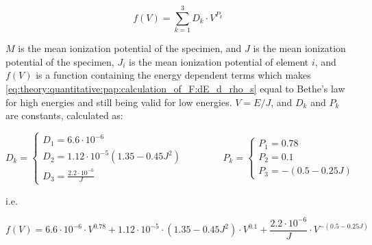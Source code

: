\begin{equation}
    \label{eq:theory:quantitative:pap:calculation_of_F:dE_d_rho_s:one_over_f}
    f(V) = \sum \limits_{k=1}^{3} D_k \cdot V^{P_k}
\end{equation}

$M$ is the mean ionization potential of the specimen, and $J$ is the mean ionization potential of the specimen, $J_i$ is the mean ionization potential of element $i$, and $f(V)$ is a function containing the energy dependent terms which makes \cref{eq:theory:quantitative:pap:calculation_of_F:dE_d_rho_s} equal to Bethe's law for high energies and still being valid for low energies. $V = E/J$, and $D_k$ and $P_k$ are constants, calculated as:


\begin{equation}
    \label{eq:theory:quantitative:pap:calculation_of_F:dE_d_rho_s:one_over_f:d_k}
    D_k = \begin{cases}
        D_1 = 6.6 \cdot 10^{-6}                                 \\
        D_2 = 1.12 \cdot 10^{-5}(1.35 - 0.45 J^2) \qquad \qquad \\
        D_3 = \frac{2.2 \cdot 10^{-6}}{J}
    \end{cases}
    P_k = \begin{cases}
        P_1 =  0.78 \\
        P_2 = 0.1   \\
        P_3 =  -(0.5-0.25J)
    \end{cases}
\end{equation}


i.e.

\begin{equation}
    \label{eq:theory:quantitative:pap:calculation_of_F:dE_d_rho_s:one_over_f_2}
    f(V) = 6.6 \cdot 10^{-6}\cdot V^{0.78} + 1.12\cdot 10^{-5}\cdot (1.35 - 0.45 J^2) \cdot V^{0.1} + \frac{2.2 \cdot 10^{-6}}{J} \cdot V^{-(0.5-0.25J)}
\end{equation}



